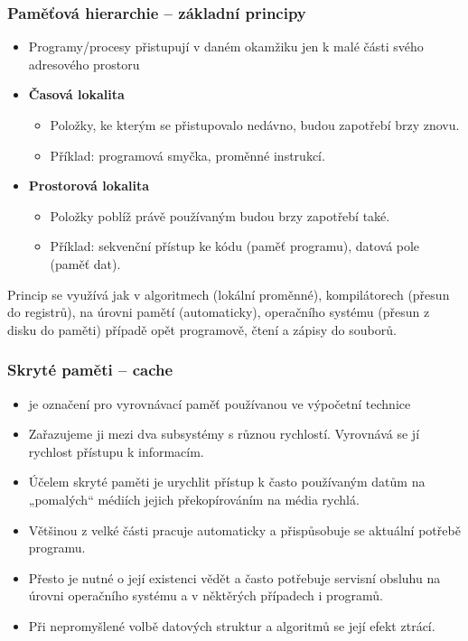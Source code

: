 \documentclass{beamer}
\begin{document}
\begin{frame}
\frametitle{Paměťová hierarchie -- základní principy}

\begin{itemize}
\item Programy/procesy přistupují v daném okamžiku jen k malé části svého adresového prostoru 
\item \textbf{Časová lokalita}
\begin{itemize}
\item Položky, ke kterým se přistupovalo nedávno, budou zapotřebí brzy znovu.
\item Příklad: programová smyčka, proměnné instrukcí.
\end{itemize}
\item \textbf{Prostorová lokalita}
\begin{itemize}
\item Položky poblíž právě používaným budou brzy zapotřebí také. 
\item Příklad: sekvenční přístup ke kódu (paměť programu), datová pole (paměť dat).
\end{itemize}
\end{itemize}
Princip se využívá jak v algoritmech (lokální proměnné), kompilátorech (přesun do registrů), na úrovni pamětí (automaticky), operačního systému (přesun z disku do paměti) případě opět programově, čtení a zápisy do souborů.
\end{frame}

\begin{frame}
\frametitle{Skryté paměti -- cache}

\begin{itemize}
\item je označení pro vyrovnávací paměť používanou ve výpočetní technice
\item Zařazujeme ji mezi dva subsystémy s různou rychlostí. Vyrovnává se jí rychlost přístupu k informacím.
\item Účelem skryté paměti je urychlit přístup k často používaným datům na „pomalých“ médiích jejich překopírováním na média rychlá.
\item Většinou z velké části pracuje automaticky a přispůsobuje se aktuální potřebě programu.
\item Přesto je nutné o její existenci vědět a často potřebuje servisní obsluhu na úrovni operačního systému a v něktěrých případech i programů.
\item Při nepromyšlené volbě datových struktur a algoritmů se její efekt ztrácí.
\end{itemize}

\end{frame}
\end{document}
